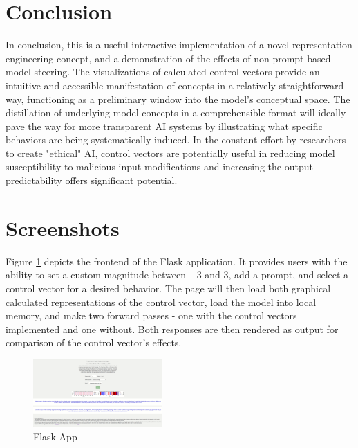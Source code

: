 \documentclass[11pt,a4paper]{article}
\begin{document}
\section{Conclusion}
In conclusion, this is a useful interactive implementation of a novel representation engineering concept, and a demonstration of the effects of non-prompt based model steering. The visualizations of calculated control vectors provide an intuitive and accessible manifestation of concepts in a relatively straightforward way, functioning as a preliminary window into the model's conceptual space. The distillation of underlying model concepts in a comprehensible format will ideally pave the way for more transparent AI systems by illustrating what specific behaviors are being systematically induced. In the constant effort by researchers to create "ethical" AI, control vectors are potentially useful in reducing model susceptibility to malicious input modifications and increasing the output predictability offers significant potential. 






\appendix

\section{Screenshots}\label{appendix:A}

Figure \ref{fig:demo} depicts the frontend of the Flask application. It provides users with the ability to set a custom magnitude between $-3$ and $3$, add a prompt, and select a control vector for a desired behavior. The page will then load both graphical calculated representations of the control vector, load the model into local memory, and make two forward passes - one with the control vectors implemented and one without. Both responses are then rendered as output for comparison of the control vector's effects.

\begin{figure}[!ht]
\centering
\includegraphics[width = 0.44\textwidth]{assets/demo_screenshot.png}
\caption{Flask App}
\label{fig:demo}
\end{figure}
\end{document}
